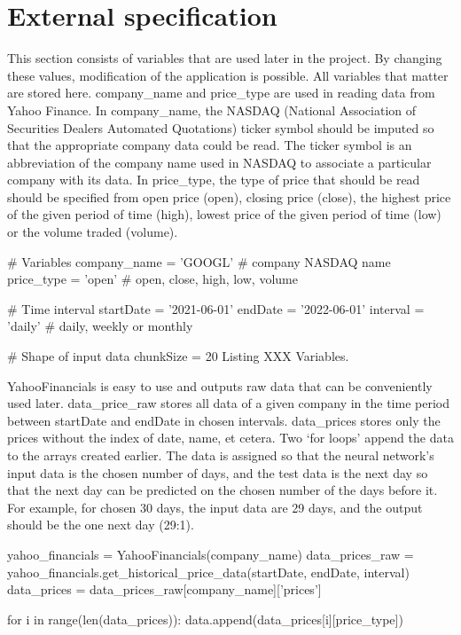 \documentclass[a4paper,twoside,12pt]{book}
\begin{document}
\chapter{External specification}
\begin{itemize}

	This section consists of variables that are used later in the project. By changing these values, modification of the application is possible. All variables that matter are stored here. company_name and price_type are used in reading data from Yahoo Finance. In company_name, the NASDAQ (National Association of Securities Dealers Automated Quotations) ticker symbol should be imputed so that the appropriate company data could be read. The ticker symbol is an abbreviation of the company name used in NASDAQ to associate a particular company with its data. In price_type, the type of price that should be read should be specified from open price (open), closing price (close), the highest price of the given period of time (high), lowest price of the given period of time (low) or the volume traded (volume).

	# Variables
	company_name = 'GOOGL' # company NASDAQ name
	price_type = 'open' # open, close, high, low, volume
	
	
	# Time interval
	startDate = '2021-06-01'
	endDate = '2022-06-01'
	interval = 'daily' # daily, weekly or monthly
	
	
	# Shape of input data
	chunkSize = 20
	Listing XXX Variables.
	
	YahooFinancials is easy to use and outputs raw data that can be conveniently used later. data_price_raw stores all data of a given company in the time period between startDate and endDate in chosen intervals. data_prices stores only the prices without the index of date, name, et cetera.
	Two ‘for loops’ append the data to the arrays created earlier. The data is assigned so that the neural network’s input data is the chosen number of days, and the test data is the next day so that the next day can be predicted on the chosen number of the days before it. For example, for chosen 30 days, the input data are 29 days, and the output should be the one next day (29:1).
	
	yahoo_financials = YahooFinancials(company_name)
	data_prices_raw = yahoo_financials.get_historical_price_data(startDate, endDate, interval)
	data_prices = data_prices_raw[company_name]['prices']
	
	
	for i in range(len(data_prices)):
	 data.append(data_prices[i][price_type])
	

\end{itemize}
\end{document}
